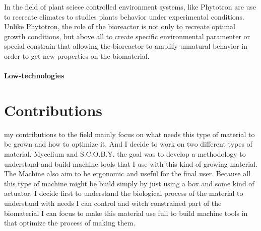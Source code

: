 In the field of plant sciece controlled environment systems, like Phytotron are use to recreate climates to studies plants behavior under experimental conditions.
Unlike Phytotron, the role of the bioreactor is not only to recreate optimal growth conditions, but above all to create specific environmental paramenter or special constrain that allowing the bioreactor to amplify unnatural behavior in order to get new properties on the biomaterial.
 



\paragraph[short]{Low-technologies} 








\section{Contributions}

my contributions to the field mainly focus on what needs this type of material to be grown and how to optimize it.
And I decide to work on two different types of material. Mycelium and S.C.O.B.Y. 
the goal was to develop a methodology to understand and build machine tools that I use with this kind of growing material. 
The Machine also aim to be ergonomic and useful for the final user. Because all this type of machine might be build simply by just using a box and some kind of actuator.
I decide first to understand the biological process of the material to understand with needs I can control and witch constrained part of the biomaterial I can focus to make 
this material use full to build machine tools in that optimize the process of making them. 